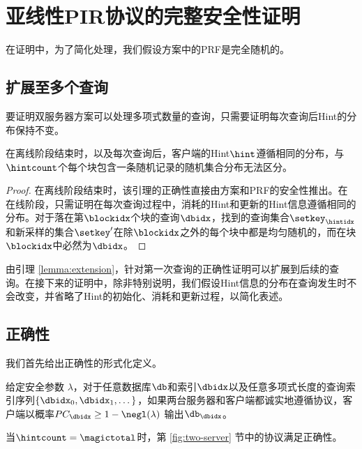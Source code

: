 \section{亚线性PIR协议的完整安全性证明}
\label{appendix:security}
在证明中，为了简化处理，我们假设方案中的PRF是完全随机的。

\subsection{扩展至多个查询}
\label{appendix:extension-to-multiple-queries}
要证明双服务器方案可以处理多项式数量的查询，只需要证明每次查询后Hint的分布保持不变。

\begin{lemma}
\label{lemma:extension}
在离线阶段结束时，以及每次查询后，客户端的Hint$\hint$遵循相同的分布，与$\hintcount$个每个块包含一条随机记录的随机集合分布无法区分。
\end{lemma}

\begin{proof}
在离线阶段结束时，该引理的正确性直接由方案和PRF的安全性推出。在在线阶段，只需证明在每次查询过程中，消耗的Hint和更新的Hint信息遵循相同的分布。对于落在第$\blockidx$个块的查询$\dbidx$，找到的查询集合$\setkey_\hintidx$和新采样的集合$\setkey'$在除$\blockidx$之外的每个块中都是均匀随机的，而在块$\blockidx$中必然为$\dbidx$。
\end{proof}

由引理 \ref{lemma:extension}，针对第一次查询的正确性证明可以扩展到后续的查询。在接下来的证明中，除非特别说明，我们假设Hint信息的分布在查询发生时不会改变，并省略了Hint的初始化、消耗和更新过程，以简化表述。

\subsection{正确性}

我们首先给出正确性的形式化定义。

\begin{definition}[双服务器方案的正确性]
给定安全参数 $\lambda$，对于任意数据库$\db$和索引$\dbidx$以及任意多项式长度的查询索引序列$\{\dbidx_0,\dbidx_1, \dots\}$，如果两台服务器和客户端都诚实地遵循协议，客户端以概率$PC_\dbidx \geq 1-\negl(\lambda)$ 输出$\db_\dbidx$。
\end{definition}

\begin{theorem}
    当$\hintcount=\magictotal$时，第 \ref{fig:two-server} 节中的协议满足正确性。
\end{theorem}

